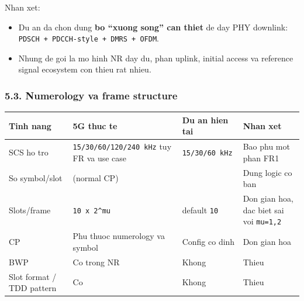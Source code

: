 \documentclass[
  vietnamese,
  a4paper,
  11pt]{article}
\newcounter{none} %
\providecommand{\tightlist}{%
  \setlength{\itemsep}{0pt}\setlength{\parskip}{0pt}}
\begin{document}
Nhan xet:

\begin{itemize}
\tightlist
\item
  Du an da chon dung \textbf{bo ``xuong song'' can thiet} de day PHY
  downlink: \texttt{PDSCH\ +\ PDCCH-style\ +\ DMRS\ +\ OFDM}.
\item
  Nhung de goi la mo hinh NR day du, phan uplink, initial access va
  reference signal ecosystem con thieu rat nhieu.
\end{itemize}

\subsubsection{5.3. Numerology va frame
structure}\label{numerology-va-frame-structure}

{\def\LTcaptype{none} %
\begin{longtable}[]{@{}
  >{\raggedright\arraybackslash}p{}
  >{\raggedright\arraybackslash}p{}
  >{\raggedright\arraybackslash}p{}
  >{\raggedright\arraybackslash}p{}@{}}
\toprule\noalign{}
\begin{minipage}[b]{\linewidth}\raggedright
Tinh nang
\end{minipage} & \begin{minipage}[b]{\linewidth}\raggedright
5G thuc te
\end{minipage} & \begin{minipage}[b]{\linewidth}\raggedright
Du an hien tai
\end{minipage} & \begin{minipage}[b]{\linewidth}\raggedright
Nhan xet
\end{minipage} \\
\midrule\noalign{}
\endhead
\bottomrule\noalign{}
\endlastfoot
SCS ho tro & \texttt{15/30/60/120/240\ kHz} tuy FR va use case &
\texttt{15/30/60\ kHz} & Bao phu mot phan FR1 \\
So symbol/slot & 14 (normal CP) & 14 & Dung logic co ban \\
Slots/frame & \texttt{10\ x\ 2\^{}mu} & default \texttt{10} & Don gian
hoa, dac biet sai voi \texttt{mu=1,2} \\
CP & Phu thuoc numerology va symbol & Config co dinh & Don gian hoa \\
BWP & Co trong NR & Khong & Thieu \\
Slot format / TDD pattern & Co & Khong & Thieu \\
\end{longtable}
}
\end{document}
